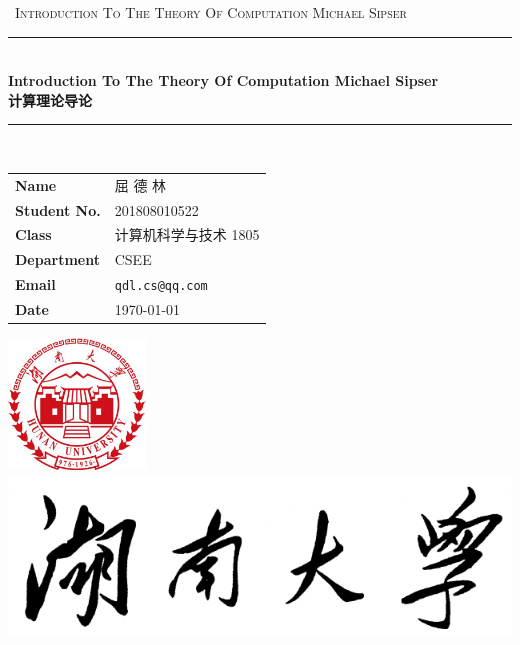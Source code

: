 \documentclass[12pt,UTF8, openany]{ctexart}
\begin{document}
	
	
	\begin{titlepage}
		\clearpage\thispagestyle{empty}
		\centering
		\vspace{1cm}
		
		{\
			\textsc{Introduction To The Theory Of Computation Michael Sipser}
		}
		\vspace{2.5cm}
		
		\rule{\linewidth}{2mm} \\[0.5cm]
		{ \Huge \bfseries Introduction To The Theory Of Computation Michael Sipser\\[0.2em]
			计算理论导论}\\[0.5cm]
		\rule{\linewidth}{0.6mm} \\[1.5cm]
		
		\hspace{2cm}
		\begin{tabular}{l p{5cm}}
			\textbf{Name} & 屈 德 林 \\[10pt]
			\textbf{Student No.} & 201808010522 \\[10pt]
			\textbf{Class} & 计算机科学与技术 1805 \\[10pt]
			\textbf{Department} & CSEE \\[10pt]
			\textbf{Email} & \texttt{qdl.cs@qq.com} \\[10pt]
			\textbf{Date} & \today \\            
		\end{tabular}
		
		
		\vfill
		\centering \includegraphics[height=3.5cm]{bit_logo.png}\\ %
		\centering \includegraphics[scale=0.3]{logo_slogan.png}
		\vspace{0.5cm}
		
		
		\pagebreak
		
	\end{titlepage}
	
	{\hypersetup{linkcolor=black}
		\tableofcontents{}
	}
	

	
\end{document}
